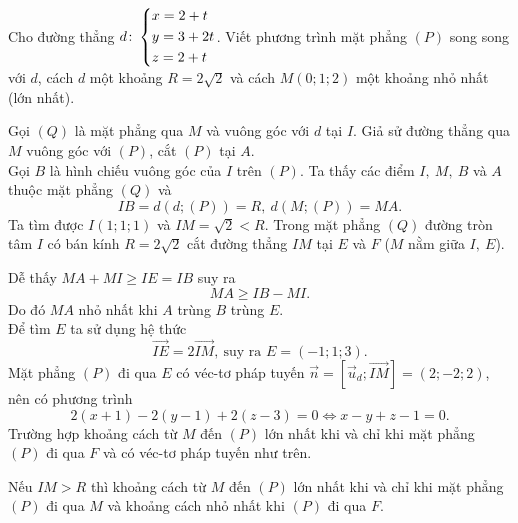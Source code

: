 \begin{vd}%
Cho đường thẳng $d\colon\left\{\begin{aligned}&x=2+t\\&y=3+2t\\&z=2+t\end{aligned}\right.$. Viết phương trình mặt phẳng $(P)$ song song với $d$, cách $d$ một khoảng $R=2\sqrt{2}$ và cách $M(0;1;2)$ một khoảng nhỏ nhất (lớn nhất).
\loigiai
{
\immini
{Gọi $(Q)$ là mặt phẳng qua $M$ và vuông góc với $d$ tại $I$. Giả sử đường thẳng qua $M$ vuông góc với $(P)$, cắt $(P)$ tại $A$.\\
Gọi $B$ là hình chiếu vuông góc của $I$ trên $(P)$. Ta thấy các điểm $I,~M,~B$ và $A$ thuộc mặt phẳng $(Q)$ và
\[IB=d(d;(P))=R,~d(M;(P))=MA.\]
Ta tìm được $I(1;1;1)$ và $IM=\sqrt{2}<R$. Trong mặt phẳng $(Q)$ đường tròn tâm $I$ có bán kính $R=2\sqrt{2}$ cắt đường thẳng $IM$ tại $E$ và $F$ ($M$ nằm giữa $I,~E$).
}
{}
\noindent Dễ thấy $MA+MI\ge IE=IB$ suy ra
\[ MA\ge IB-MI.\]
Do đó $MA$ nhỏ nhất khi $A$ trùng $B$ trùng $E$.\\
Để tìm $E$ ta sử dụng hệ thức
\[\vec{IE}=2\vec{IM},~\text{suy ra } E=(-1;1;3).\]
Mặt phẳng $(P)$ đi qua $E$ có véc-tơ pháp tuyến $\vec{n}=\left[\vec{u}_d;\vec{IM}\right]=(2;-2;2)$, nên có phương trình 
\[2(x+1)-2(y-1)+2(z-3)=0\Leftrightarrow x-y+z-1=0.\]
Trường hợp khoảng cách từ $M$ đến $(P)$ lớn nhất khi và chỉ khi mặt phẳng $(P)$ đi qua $F$ và có véc-tơ pháp tuyến như trên.
\begin{nx}
Nếu $IM>R$ thì khoảng cách từ $M$ đến $(P)$ lớn nhất khi và chỉ khi mặt phẳng $(P)$ đi qua $M$ và khoảng cách nhỏ nhất khi $(P)$ đi qua $F$.
\end{nx}
}
\end{vd}
